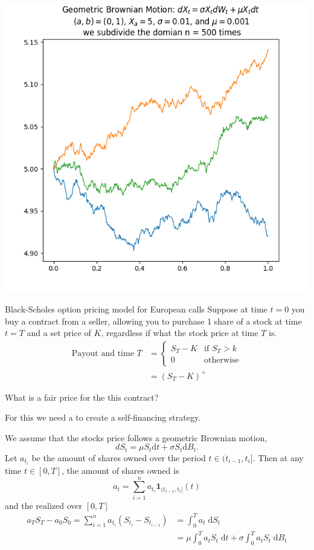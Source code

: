 \documentclass{beamer}%
\numberwithin{equation}{section}
\newcommand{\ud}{\ensuremath{\mathrm{d} }}
\begin{document}
\begin{frame}
	\begin{center}
	\includegraphics[scale=.64]{geometricbmotion.png}
	\end{center}
\end{frame}

\begin{frame}{Black-Scholes option pricing model for European calls}
		Suppose at time $t=0$ you buy a contract from a seller, allowing you to purchase 1 share of a stock at time $t=T$ and a set price of $K$, regardless if what the stock price at time $T$ is. 
		\begin{align*} 
		\text{Payout and time $T$} &=
			\begin{cases}
				S_T - K & \text{if } S_T > k \\
				0 & \text{otherwise}
			\end{cases} \\
			&= (S_T - K)^+
		\end{align*}

What is a fair price for the this contract? 

For this we need a to create a self-financing strategy.
\end{frame}

\begin{frame}
	We assume that the stocks price follows a geometric Brownian motion,
		\[
			dS_t = \mu S_t \ud t + \sigma S_t \ud B_t.
		\]
	Let $a_{t_{i}}$ be the amount of shares owned over the period $t \in (t_{i-1}, t_i]$. Then at any time $t \in [0,T]$, the amount of shares owned is 
		\[
			a_t = \sum_{i=1}^n a_{t_i} \textbf{1}_{(t_{i-1}, t_i]}(t)
		\]
	and the realized over $[0,T]$ 
		\begin{align*}
			a_TS_T - a_0S_0 = \sum_{i=1}^n a_{t_i} (S_{t_{i}} - S_{t_{i-1}}) &= \int_0^T a_t \; \ud S_t \\
			&= \mu \int_0^T a_t S_t \; \ud t + \sigma \int_0^T a_t S_t \; \ud B_t
		\end{align*}
\end{frame}
\end{document}
